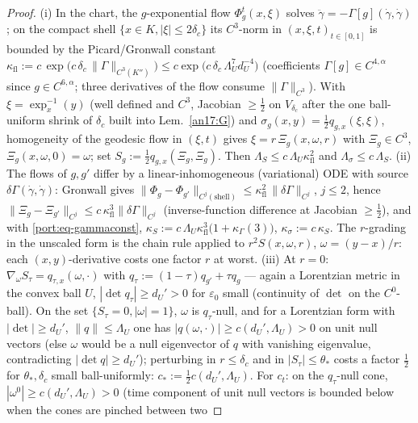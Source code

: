 \begin{proof}
(i) In the chart, the $g$-exponential flow $\Phi^t_g(x,\xi)$ solves
$\ddot\gamma=-\Gamma[g](\dot\gamma,\dot\gamma)$; on the compact shell
$\{x\in K,|\xi|\le2\delta_c\}$ its $C^3$-norm in $(x,\xi,t)_{t\in[0,1]}$
is bounded by the Picard/Gronwall constant
$\kappa_{\mathrm{fl}}:=c\,\exp\bigl(c\,\delta_c\,
\|\Gamma\|_{C^3(K'')}\bigr)\le
c\exp\bigl(c\,\delta_c\,\Lambda_U^{7}d_U^{-4}\bigr)$
(coefficients $\Gamma[g]\in C^{4,\alpha}$ since $g\in C^{6,\alpha}$;
three derivatives of the flow consume $\|\Gamma\|_{C^3}$). With
$\xi=\exp_x^{-1}(y)$ (well defined and $C^3$, Jacobian
$\ge\tfrac12$ on $V_{\delta_c}$ after the one ball-uniform shrink of
$\delta_c$ built into Lem.~\ref{an17:G}) and
$\sigma_g(x,y)=\tfrac12 q_{g,x}(\xi,\xi)$, homogeneity of the geodesic
flow in $(\xi,t)$ gives $\xi=r\,\Xi_g(x,\omega,r)$ with
$\Xi_g\in C^3$, $\Xi_g(x,\omega,0)=\omega$; set
$S_g:=\tfrac12 q_{g,x}(\Xi_g,\Xi_g)$. Then $\Lambda_S\le
c\,\Lambda_U\kappa_{\mathrm{fl}}^2$ and
$\Lambda_\sigma\le c\,\Lambda_S$.
(ii) The flows of $g,g'$ differ by a linear-inhomogeneous
(variational) ODE with source $\delta\Gamma(\dot\gamma,\dot\gamma)$:
Gronwall gives
$\|\Phi_g-\Phi_{g'}\|_{C^j(\text{shell})}\le
\kappa_{\mathrm{fl}}^2\,\|\delta\Gamma\|_{C^j}$, $j\le2$, hence
$\|\Xi_g-\Xi_{g'}\|_{C^j}\le c\,\kappa_{\mathrm{fl}}^3
\|\delta\Gamma\|_{C^j}$ (inverse-function difference at Jacobian
$\ge\tfrac12$), and with \eqref{port:eq-gammaconst},
$\kappa_S:=c\,\Lambda_U\kappa_{\mathrm{fl}}^{3}
\bigl(1+\kappa_\Gamma(3)\bigr)$,
$\kappa_\sigma:=c\,\kappa_S$. The $r$-grading in the unscaled form is
the chain rule applied to $r^2S(x,\omega,r)$, $\omega=(y-x)/r$: each
$(x,y)$-derivative costs one factor $r$ at worst.
(iii) At $r=0$: $\nabla_\omega S_\tau=q_{\tau,x}(\omega,\cdot)$ with
$q_\tau:=(1-\tau)q_{g'}+\tau q_g$ --- again a Lorentzian metric in the
convex ball $U$, $|\det q_\tau|\ge d_U'>0$ for $\varepsilon_0$ small
(continuity of $\det$ on the $C^0$-ball). On the set
$\{S_\tau=0,|\omega|=1\}$, $\omega$ is $q_\tau$-null, and for a
Lorentzian form with $|\det|\ge d_U'$, $\|q\|\le\Lambda_U$ one has
$|q(\omega,\cdot)|\ge c(d_U',\Lambda_U)>0$ on unit null vectors
(else $\omega$ would be a null eigenvector of $q$ with vanishing
eigenvalue, contradicting $|\det q|\ge d_U'$); perturbing in
$r\le\delta_c$ and in $|S_\tau|\le\theta_*$ costs a factor
$\tfrac12$ for $\theta_*,\delta_c$ small ball-uniformly:
$c_*:=\tfrac12c(d_U',\Lambda_U)$. For $c_t$: on the $q_\tau$-null
cone, $|\omega^0|\ge c(d_U',\Lambda_U)>0$ (time component of unit
null vectors is bounded below when the cones are pinched between two

\end{proof}
